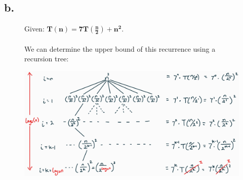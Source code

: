 \documentclass{article}
\begin{document}
        \subsection*{b.}
            
            \begin{figure}[ht]
                \centering
                \begin{minipage}{0.9\textwidth}
                    Given: $\mathbf{T(n) = 7T\left(\frac{n}{2}\right)+n^{2}}$.\\\\
                    We can determine the upper bound of this recurrence using a recursion tree:\\
                \end{minipage}
                \begin{minipage}{0.9\textwidth}
                    \includegraphics[width=5.3in]{1b_diagram.jpg}
                \end{minipage}
            \end{figure}

            \newpage
\end{document}
